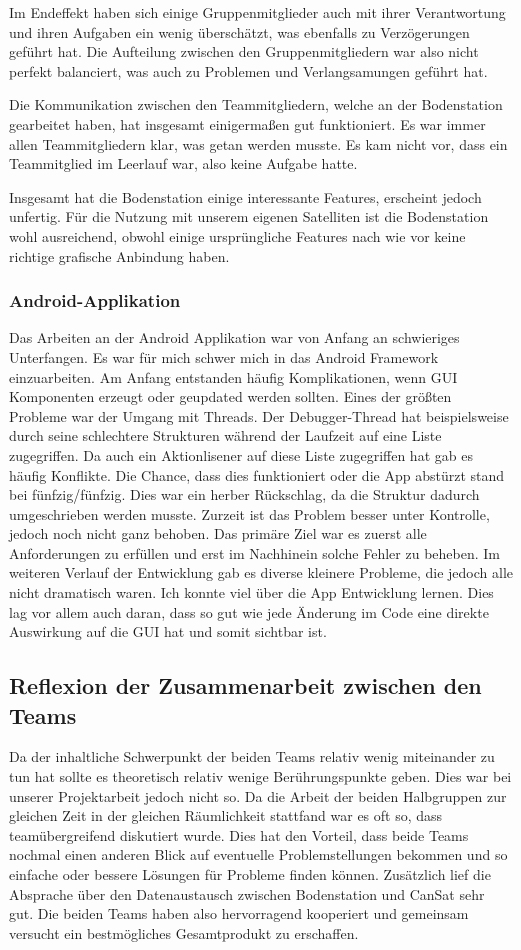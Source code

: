 Im Endeffekt haben sich einige Gruppenmitglieder auch mit ihrer Verantwortung und ihren Aufgaben ein wenig überschätzt, was ebenfalls zu Verzögerungen geführt hat. Die Aufteilung zwischen den Gruppenmitgliedern war also nicht perfekt balanciert, was auch zu Problemen und Verlangsamungen geführt hat.

Die Kommunikation zwischen den Teammitgliedern, welche an der Bodenstation gearbeitet haben, hat insgesamt einigermaßen gut funktioniert. Es war immer allen Teammitgliedern klar, was getan werden musste. Es kam nicht vor, dass ein Teammitglied im Leerlauf war, also keine Aufgabe hatte.

Insgesamt hat die Bodenstation einige interessante Features, erscheint jedoch unfertig. Für die Nutzung mit unserem eigenen Satelliten ist die Bodenstation wohl ausreichend, obwohl einige ursprüngliche Features nach wie vor keine richtige grafische Anbindung haben.

\subsubsection{Android-Applikation}
Das Arbeiten an der Android Applikation war von Anfang an schwieriges Unterfangen. Es war für mich schwer mich in das Android Framework einzuarbeiten. Am Anfang entstanden häufig Komplikationen, wenn GUI Komponenten erzeugt oder geupdated werden sollten. Eines der größten Probleme war der Umgang mit Threads. Der Debugger-Thread hat beispielsweise durch seine schlechtere Strukturen während der Laufzeit auf eine Liste zugegriffen. Da auch ein Aktionlisener auf diese Liste zugegriffen hat gab es häufig Konflikte. Die Chance, dass dies funktioniert oder die App abstürzt stand bei fünfzig/fünfzig. Dies war ein herber Rückschlag, da die Struktur dadurch umgeschrieben werden musste. Zurzeit ist das Problem besser unter Kontrolle, jedoch noch nicht ganz behoben. Das primäre Ziel war es zuerst alle Anforderungen zu erfüllen und erst im Nachhinein solche Fehler zu beheben. Im weiteren Verlauf der Entwicklung gab es diverse kleinere Probleme, die jedoch alle nicht dramatisch waren. Ich konnte viel über die App Entwicklung lernen. Dies lag vor allem auch daran, dass so gut wie jede Änderung im Code eine direkte Auswirkung auf die GUI hat und somit sichtbar ist.

\subsection{Reflexion der Zusammenarbeit zwischen den Teams}
Da der inhaltliche Schwerpunkt der beiden Teams relativ wenig miteinander zu tun hat sollte es theoretisch relativ wenige Berührungspunkte geben. Dies war bei unserer Projektarbeit jedoch nicht so. Da die Arbeit der beiden Halbgruppen zur gleichen Zeit in der gleichen Räumlichkeit stattfand war es oft so, dass teamübergreifend  diskutiert wurde. Dies hat den Vorteil, dass beide Teams nochmal einen anderen Blick auf eventuelle Problemstellungen bekommen und so einfache oder bessere Lösungen für Probleme finden können. Zusätzlich lief die Absprache über den Datenaustausch zwischen Bodenstation und CanSat sehr gut. Die beiden Teams haben also hervorragend kooperiert und gemeinsam versucht ein bestmögliches Gesamtprodukt zu erschaffen.
